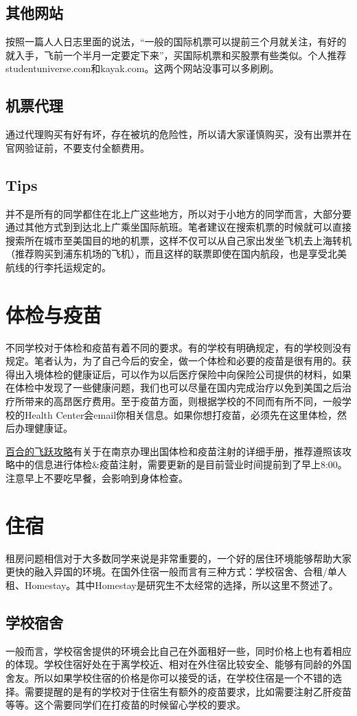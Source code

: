 \subsection{其他网站}
按照一篇人人日志里面的说法，“一般的国际机票可以提前三个月就关注，有好的就入手，飞前一个半月一定要定下来”，买国际机票和买股票有些类似。个人推荐studentuniverse.com和kayak.com。这两个网站没事可以多刷刷。
\subsection{机票代理}
通过代理购买有好有坏，存在被坑的危险性，所以请大家谨慎购买，没有出票并在官网验证前，不要支付全额费用。
\subsection{Tips}
并不是所有的同学都住在北上广这些地方，所以对于小地方的同学而言，大部分要通过其他方式到到达北上广乘坐国际航班。笔者建议在搜索机票的时候就可以直接搜索所在城市至美国目的地的机票，这样不仅可以从自己家出发坐飞机去上海转机（推荐购买到浦东机场的飞机），而且这样的联票即使在国内航段，也是享受北美航线的行李托运规定的。
\section{体检与疫苗}
不同学校对于体检和疫苗有着不同的要求。有的学校有明确规定，有的学校则没有规定。笔者认为，为了自己今后的安全，做一个体检和必要的疫苗是很有用的。获得出入境体检的健康证后，可以作为以后医疗保险中向保险公司提供的材料，如果在体检中发现了一些健康问题，我们也可以尽量在国内完成治疗以免到美国之后治疗所带来的高昂医疗费用。至于疫苗方面，则根据学校的不同而有所不同，一般学校的Health Center会email你相关信息。如果你想打疫苗，必须先在这里体检，然后办理健康证。\par
\href{http://bbs.nju.edu.cn/file/S/superphoenix/LSFF.htm}{百合的飞跃攻略}有关于在南京办理出国体检和疫苗注射的详细手册，推荐遵照该攻略中的信息进行体检\&疫苗注射，需要更新的是目前营业时间提前到了早上8:00。注意早上不要吃早餐，会影响到身体检查。
\section{住宿}
租房问题相信对于大多数同学来说是非常重要的，一个好的居住环境能够帮助大家更快的融入异国的环境。在国外住宿一般而言有三种方式：学校宿舍、合租/单人租、Homestay。其中Homestay是研究生不太经常的选择，所以这里不赘述了。
\subsection{学校宿舍}
一般而言，学校宿舍提供的环境会比自己在外面租好一些，同时价格上也有着相应的体现。学校住宿好处在于离学校近、相对在外住宿比较安全、能够有同龄的外国舍友。所以如果学校住宿的价格是你可以接受的话，在学校住宿是一个不错的选择。需要提醒的是有的学校对于住宿生有额外的疫苗要求，比如需要注射乙肝疫苗等等。这个需要同学们在打疫苗的时候留心学校的要求。
